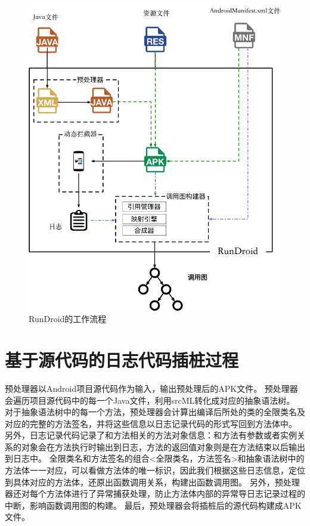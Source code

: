 \begin{figure}[!ht]
	\centering
	\includegraphics[height=0.4\textheight]{./Figures/rundroid-overview.png}
	\caption{ RunDroid的工作流程}
	\label{fig:rundroid_overview}
\end{figure}




\section{基于源代码的日志代码插桩过程}

预处理器以Android项目源代码作为输入，输出预处理后的APK文件。
预处理器会遍历项目源代码中的每一个Java文件，利用srcML转化成对应的抽象语法树。
对于抽象语法树中的每一个方法，预处理器会计算出编译后所处的类的全限类名及对应的完整的方法签名，并将这些信息以日志记录代码的形式写回到方法体中。
另外，日志记录代码记录了和方法相关的方法对象信息：和方法有参数或者实例关系的对象会在方法执行时输出到日志，方法的返回值对象则是在方法结束以后输出到日志中。
全限类名和方法签名的组合<全限类名，方法签名>和抽象语法树中的方法体一一对应，可以看做方法体的唯一标识，因此我们根据这些日志信息，定位到具体对应的方法体，还原出函数调用关系，构建出函数调用图。
另外，预处理器还对每个方法体进行了异常捕获处理，防止方法体内部的异常导日志记录过程的中断，影响函数调用图的构建。
最后，预处理器会将插桩后的源代码构建成APK文件。



